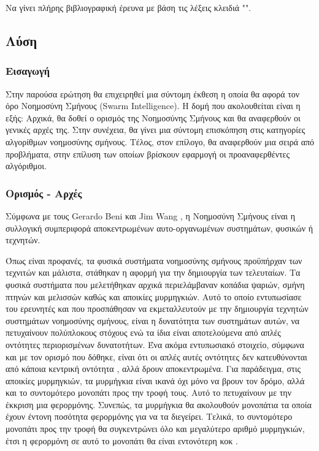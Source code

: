 \documentclass{assignment}
\begin{document}
Να γίνει πλήρης βιβλιογραφική έρευνα με βάση τις λέξεις κλειδιά "".

\subsection {Λύση}
\subsubsection{Εισαγωγή}
Στην παρούσα ερώτηση θα επιχειρηθεί μια σύντομη έκθεση η οποία θα αφορά τον όρο
Νοημοσύνη Σμήνους (Swarm Intelligence). Η δομή που ακολουθείται είναι η
εξής: Αρχικά, θα δοθεί ο ορισμός της Νοημοσύνης Σμήνους και θα αναφερθούν οι
γενικές αρχές της. Στην συνέχεια, θα γίνει μια σύντομη επισκόπηση στις
κατηγορίες αλγορίθμων νοημοσύνης σμήνους. Τέλος, στον επίλογο, θα αναφερθούν
μια σειρά από προβλήματα, στην επίλυση των οποίων βρίσκουν εφαρμογή οι
προαναφερθέντες αλγόριθμοι.
\subsubsection{Ορισμός - Αρχές}
Σύμφωνα με τους Gerardo Beni και Jim Wang \cite{beni1993swarm}, η Νοημοσύνη
Σμήνους είναι η συλλογική συμπεριφορά αποκεντρωμένων αυτο-οργανωμένων
συστημάτων, φυσικών ή τεχνητών.

Όπως είναι προφανές, τα φυσικά συστήματα νοημοσύνης σμήνους προϋπήρχαν των
τεχνιτών και μάλιστα, στάθηκαν η αφορμή για την δημιουργία των τελευταίων. Τα
φυσικά συστήματα που μελετήθηκαν αρχικά περιελάμβαναν κοπάδια ψαριών, σμήνη
πτηνών και μελισσών καθώς και αποικίες μυρμηγκιών. Αυτό το οποίο εντυπωσίασε
του ερευνητές και που προσπάθησαν να εκμεταλλευτούν με την δημιουργία τεχνητών
συστημάτων νοημοσύνης σμήνους, είναι η δυνατότητα των συστημάτων αυτών, να
πετυχαίνουν πολύπλοκους στόχους ενώ τα ίδια είναι αποτελούμενα από απλές
οντότητες περιορισμένων δυνατοτήτων. Ένα ακόμα εντυπωσιακό στοιχείο, σύμφωνα
και με τον ορισμό που δόθηκε, είναι ότι οι απλές αυτές οντότητες δεν
κατευθύνονται από κάποια κεντρική οντότητα \cite{ahmed2012swarm}, αλλά δρουν
αποκεντρωμένα. Για παράδειγμα, στις αποικίες μυρμηγκιών, τα μυρμήγκια είναι
ικανά όχι μόνο να βρουν τον δρόμο, αλλά και το συντομότερο μονοπάτι προς την
τροφή τους. Αυτό το πετυχαίνουν με την έκκριση μια φερορμόνης. Συνεπώς, τα
μυρμήγκια θα ακολουθούν μονοπάτια τα οποία έχουν έντονη ποσότητα φερορμόνης
για να τα διεγείρει. Τελικά, το συντομότερο μονοπάτι προς την τροφή θα
συγκεντρώνει όλο και μεγαλύτερο αριθμό μυρμηγκιών, έτσι η φερορμόνη σε αυτό το
μονοπάτι θα είναι εντονότερη κοκ \cite{dorigo2006ant}.
\end{document}
